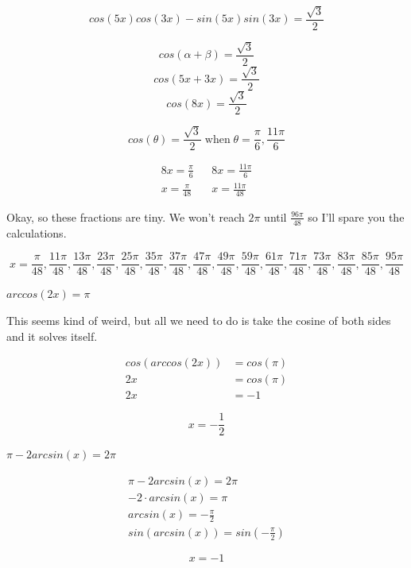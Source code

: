 \documentclass[10pt,letterpaper]{amspset}
\begin{document}
\begin{solution}
    \[cos(5x)cos(3x) - sin(5x)sin(3x) = \frac{\sqrt{3}}{2}\]
    
    \[cos(\alpha + \beta) = \frac{\sqrt{3}}{2}\]
    \[cos(5x + 3x) = \frac{\sqrt{3}}{2}\]
    \[cos(8x) = \frac{\sqrt{3}}{2}\]
    
    \[cos(\theta) = \frac{\sqrt{3}}{2} \; \text{when} \; \theta = \frac{\pi}{6}, \frac{11\pi}{6}\]
    
    \begin{align}
        8x = \frac{\pi}{6} && 8x = \frac{11\pi}{6} \\
        x = \frac{\pi}{48} && x = \frac{11\pi}{48}
    \end{align}
    
    Okay, so these fractions are tiny. We won't reach $2\pi$ until $\frac{96\pi}{48}$ so I'll spare you the calculations.
    
    \[\boxed{ x = \frac{\pi}{48}, \frac{11\pi}{48}, \frac{13\pi}{48}, \frac{23\pi}{48}, \frac{25\pi}{48}, \frac{35\pi}{48}, \frac{37\pi}{48}, \frac{47\pi}{48}, \frac{49\pi}{48}, \frac{59\pi}{48}, \frac{61\pi}{48}, \frac{71\pi}{48},\frac{73\pi}{48}, \frac{83\pi}{48},\frac{85\pi}{48}, \frac{95\pi}{48}}\]
\end{solution}


\pagebreak


\begin{problem}[59]
    $arccos(2x) = \pi$
\end{problem}

\begin{solution}
    This seems kind of weird, but all we need to do is take the cosine of both sides and it solves itself.
    
    \begin{align}
        cos(arccos(2x)) &= cos(\pi) \\
        2x &= cos(\pi) \\
        2x &= -1
    \end{align}
    
    \[\boxed{x = -\frac{1}{2}}\]
\end{solution}


\begin{problem}[60]
    $\pi - 2arcsin(x) = 2\pi$
\end{problem}

\begin{solution}
    \begin{align}
        \pi - 2arcsin(x) = 2\pi \\
        -2 \cdot arcsin(x) = \pi \\
        arcsin(x) = -\frac{\pi}{2} \\
        sin(arcsin(x)) = sin \left( -\frac{\pi}{2} \right)
    \end{align}
    
    \[\boxed{x = -1}\]
\end{solution}
\end{document}
